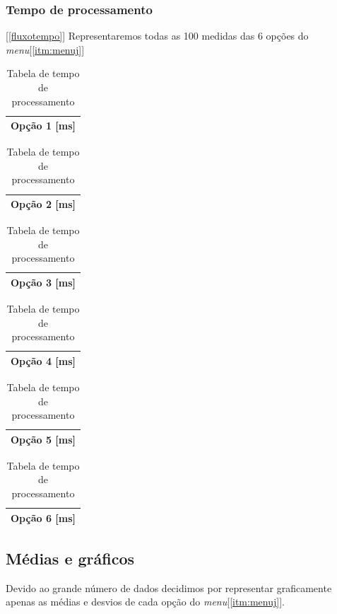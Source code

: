 \documentclass[a4paper,10pt]{article}
\begin{document}
\subsubsection{Tempo de processamento}[\ref{fluxotempo}]
Representaremos todas as 100 medidas das 6 opções do \emph{menu}[\ref{itm:menuj}]
\begin{table}
  \tiny
  \centering
  \begin{tabular}{|c|}
    \hline
    Opção 1 [ms] \\
    \hline
    
    \hline
  \end{tabular}
  \begin{tabular}{|c|}
    \hline
    Opção 2 [ms] \\
    \hline
    
    \hline
  \end{tabular}
  \begin{tabular}{|c|}
    \hline
    Opção 3 [ms] \\
    \hline
    
    \hline
  \end{tabular}
  \begin{tabular}{|c|}
    \hline
    Opção 4 [ms] \\
    \hline
    
    \hline
  \end{tabular}
  \begin{tabular}{|c|}
    \hline
    Opção 5 [ms] \\
    \hline
    
    \hline
  \end{tabular}
  \begin{tabular}{|c|}
    \hline
    Opção 6 [ms] \\
    \hline
    
    \hline
  \end{tabular}
  \caption{Tabela de tempo de processamento}
\end{table}
\newpage
\subsection{Médias e gráficos}
Devido ao grande número de dados decidimos por representar graficamente apenas as
médias e desvios de cada opção do \emph{menu}[\ref{itm:menuj}].\\
\end{document}
